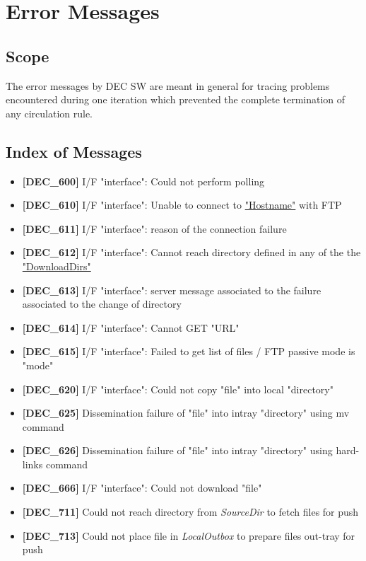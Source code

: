 \documentclass[dec_sum_main.tex]{subfiles}
\begin{document}
\newpage
\section{Error Messages}

\subsection{Scope}
The error messages by DEC SW are meant in general for tracing problems encountered during one iteration which prevented the complete termination of any circulation rule.

\subsection{Index of Messages}

\begin{itemize}
	\item \textbf{[DEC\_600]} I/F "interface": Could not perform polling
	\item \textbf{[DEC\_610]} I/F "interface": Unable to connect to \hyperref[Config_Server]{"Hostname"} with FTP
	\item \textbf{[DEC\_611]} I/F "interface": reason of the connection failure
	\item \textbf{[DEC\_612]} I/F "interface": Cannot reach directory defined in any of the the \hyperref[DownloadDirs]{"DownloadDirs"}
	\item \textbf{[DEC\_613]} I/F "interface": server message associated to the failure associated to the change of directory
	\item \textbf{[DEC\_614]} I/F "interface": Cannot GET "URL"
	\item \textbf{[DEC\_615]} I/F "interface": Failed to get list of files / FTP passive mode is "mode"
	\item \textbf{[DEC\_620]} I/F "interface": Could not copy "file" into local
"directory"
	\item \textbf{[DEC\_625]} Dissemination failure of "file" into intray
"directory" using mv command
	\item \textbf{[DEC\_626]} Dissemination failure of "file" into intray
"directory" using hard-links command
	\item \textbf{[DEC\_666]} I/F "interface": Could not download "file"
	\item \textbf{[DEC\_711]} Could not reach directory from \textit{SourceDir} to fetch files for push
	\item \textbf{[DEC\_713]} Could not place file in  \textit{LocalOutbox} to prepare files out-tray for push	
\end{itemize}
\end{document}
